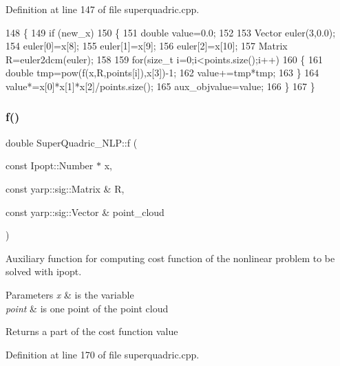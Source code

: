 Definition at line 147 of file superquadric.\+cpp.


\begin{DoxyCode}
148  \{
149      \textcolor{keywordflow}{if} (new\_x)
150      \{
151          \textcolor{keywordtype}{double} value=0.0;
152 
153          Vector euler(3,0.0);
154          euler[0]=x[8];
155          euler[1]=x[9];
156          euler[2]=x[10];
157          Matrix R=euler2dcm(euler);
158 
159          \textcolor{keywordflow}{for}(\textcolor{keywordtype}{size\_t} i=0;i<points.size();i++)
160          \{
161              \textcolor{keywordtype}{double} tmp=pow(f(x,R,points[i]),x[3])-1;
162              value+=tmp*tmp;
163          \}
164          value*=x[0]*x[1]*x[2]/points.size();
165          aux\_objvalue=value;
166      \}
167  \}
\end{DoxyCode}
\mbox{\label{classSuperQuadric__NLP_aa914a977bcaea04f375778085c40cb9a}} 
\subsubsection{\texorpdfstring{f()}{f()}}
{\footnotesize\ttfamily double Super\+Quadric\+\_\+\+N\+L\+P\+::f (\begin{DoxyParamCaption}\item[{const Ipopt\+::\+Number $\ast$}]{x,  }\item[{const yarp\+::sig\+::\+Matrix \&}]{R,  }\item[{const yarp\+::sig\+::\+Vector \&}]{point\+\_\+cloud }\end{DoxyParamCaption})\hspace{0.3cm}{\ttfamily [protected]}}



Auxiliary function for computing cost function of the nonlinear problem to be solved with ipopt. 


\begin{DoxyParams}{Parameters}
{\em x} & is the variable \\
\hline
{\em point} & is one point of the point cloud \\
\hline
\end{DoxyParams}
\begin{DoxyReturn}{Returns}
a part of the cost function value 
\end{DoxyReturn}


Definition at line 170 of file superquadric.\+cpp.


